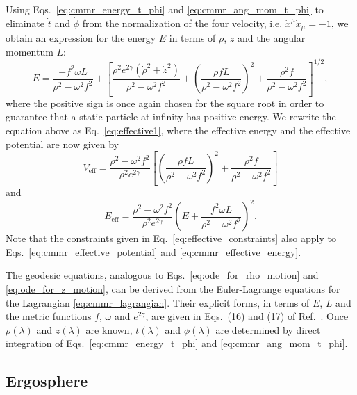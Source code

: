 Using Eqs.~\eqref{eq:cmmr_energy_t_phi} and \eqref{eq:cmmr_ang_mom_t_phi} to eliminate $\dot{t}$ and $\dot{\phi}$ from the normalization of the four velocity, i.e. $\dot{x}^\mu\dot{x}_\mu = -1$, we obtain an expression for the energy $E$ in  terms of $\dot{\rho}$, $\dot{z}$ and the angular momentum $L$:
%
\begin{equation}
  E  = \frac{-f^2\omega L}{\rho^2-\omega^2 f^2}  + \left[ \frac{\rho^2e^{2\gamma}(\dot{\rho}^2 + \dot{z}^2)}{\rho^2 - \omega^2f^2} + \left( \frac{\rho fL}{\rho^2 - \omega^2f^2} \right)^2 + \frac{\rho^2f}{\rho^2 - \omega^2f^2} \right]^{1/2},
  \label{eq:cmmr_energy_rho_z}
\end{equation}
%
where the positive sign is once again chosen for the square root in order to guarantee that a static particle at infinity has positive energy. We rewrite the equation above as Eq.~\eqref{eq:effective1}, where the effective energy and the effective potential are now given by
%
\begin{equation}
  V_{\text{eff}} = \frac{\rho^2 - \omega^2 f^2}{\rho^2 e^{2\gamma}}\left[ \left( \frac{\rho fL}{\rho^2 - \omega^2f^2} \right)^2 + \frac{\rho^2f}{\rho^2 - \omega^2f^2}\right]
  \label{eq:cmmr_effective_potential}
\end{equation}
%
and
%
\begin{equation}
  E_{\text{eff}} = \frac{\rho^2 - \omega^2 f^2}{\rho^2 e^{2\gamma}}\left(E + \frac{f^2\omega L}{\rho^2-\omega^2 f^2}\right)^2.
  \label{eq:cmmr_effective_energy}
\end{equation}
%
%
Note that the constraints given in Eq.~\eqref{eq:effective_constraints} also apply to Eqs.~\eqref{eq:cmmr_effective_potential} and \eqref{eq:cmmr_effective_energy}.

The geodesic equations, analogous to Eqs.~\eqref{eq:ode_for_rho_motion} and \eqref{eq:ode_for_z_motion}, can be derived from the Euler-Lagrange equations for the Lagrangian \eqref{eq:cmmr_lagrangian}. Their explicit forms, in terms of $E$, $L$ and the metric functions $f$, $\omega$ and $e^{2\gamma}$, are given in Eqs.~(16) and (17) of Ref.~\cite{Dubeibe2016}. Once $\rho(\lambda)$ and $z(\lambda)$ are known, $t(\lambda)$ and $\phi(\lambda)$ are determined by direct integration of Eqs.~\eqref{eq:cmmr_energy_t_phi} and \eqref{eq:cmmr_ang_mom_t_phi}.


\subsection{Ergosphere}

